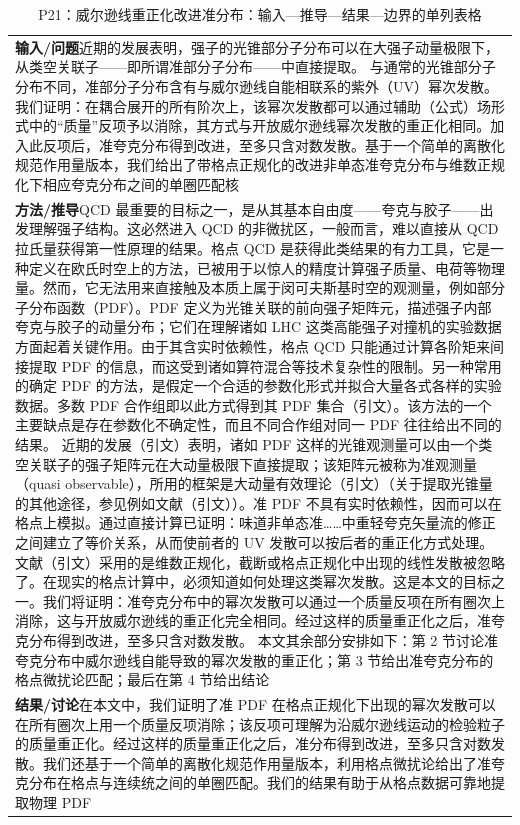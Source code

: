 \documentclass[UTF8,11pt,oneside]{ctexbook}
\begin{document}
\begin{table}[htbp]
  \centering
  \caption*{P21：威尔逊线重正化改进准分布：输入—推导—结果—边界的单列表格}
  \small
  \begin{tabular}{@{}p{}@{}}
    \toprule
    \textbf{输入/问题}\quad 近期的发展表明，强子的光锥部分子分布可以在大强子动量极限下，从类空关联子——即所谓准部分子分布——中直接提取。 与通常的光锥部分子分布不同，准部分子分布含有与威尔逊线自能相联系的紫外（UV）幂次发散。 我们证明：在耦合展开的所有阶次上，该幂次发散都可以通过辅助（公式）场形式中的“质量”反项予以消除，其方式与开放威尔逊线幂次发散的重正化相同。加入此反项后，准夸克分布得到改进，至多只含对数发散。基于一个简单的离散化规范作用量版本，我们给出了带格点正规化的改进非单态准夸克分布与维数正规化下相应夸克分布之间的单圈匹配核 \\
    \textbf{方法/推导}\quad QCD 最重要的目标之一，是从其基本自由度——夸克与胶子——出发理解强子结构。这必然进入 QCD 的非微扰区，一般而言，难以直接从 QCD 拉氏量获得第一性原理的结果。格点 QCD 是获得此类结果的有力工具，它是一种定义在欧氏时空上的方法，已被用于以惊人的精度计算强子质量、电荷等物理量。然而，它无法用来直接触及本质上属于闵可夫斯基时空的观测量，例如部分子分布函数（PDF）。PDF 定义为光锥关联的前向强子矩阵元，描述强子内部夸克与胶子的动量分布；它们在理解诸如 LHC 这类高能强子对撞机的实验数据方面起着关键作用。由于其含实时依赖性，格点 QCD 只能通过计算各阶矩来间接提取 PDF 的信息，而这受到诸如算符混合等技术复杂性的限制。另一种常用的确定 PDF 的方法，是假定一个合适的参数化形式并拟合大量各式各样的实验数据。多数 PDF 合作组即以此方式得到其 PDF 集合（引文）。该方法的一个主要缺点是存在参数化不确定性，而且不同合作组对同一 PDF 往往给出不同的结果。 近期的发展（引文）表明，诸如 PDF 这样的光锥观测量可以由一个类空关联子的强子矩阵元在大动量极限下直接提取；该矩阵元被称为准观测量（quasi observable），所用的框架是大动量有效理论（引文）（关于提取光锥量的其他途径，参见例如文献（引文））。准 PDF 不具有实时依赖性，因而可以在格点上模拟。通过直接计算已证明：味道非单态准……中重轻夸克矢量流的修正之间建立了等价关系，从而使前者的 UV 发散可以按后者的重正化方式处理。文献（引文）采用的是维数正规化，截断或格点正规化中出现的线性发散被忽略了。在现实的格点计算中，必须知道如何处理这类幂次发散。这是本文的目标之一。我们将证明：准夸克分布中的幂次发散可以通过一个质量反项在所有圈次上消除，这与开放威尔逊线的重正化完全相同。经过这样的质量重正化之后，准夸克分布得到改进，至多只含对数发散。 本文其余部分安排如下：第 2 节讨论准夸克分布中威尔逊线自能导致的幂次发散的重正化；第 3 节给出准夸克分布的格点微扰论匹配；最后在第 4 节给出结论 \\
    \textbf{结果/讨论}\quad 在本文中，我们证明了准 PDF 在格点正规化下出现的幂次发散可以在所有圈次上用一个质量反项消除；该反项可理解为沿威尔逊线运动的检验粒子的质量重正化。经过这样的质量重正化之后，准分布得到改进，至多只含对数发散。我们还基于一个简单的离散化规范作用量版本，利用格点微扰论给出了准夸克分布在格点与连续统之间的单圈匹配。我们的结果有助于从格点数据可靠地提取物理 PDF \\

\end{tabular}
\end{table}
\end{document}
